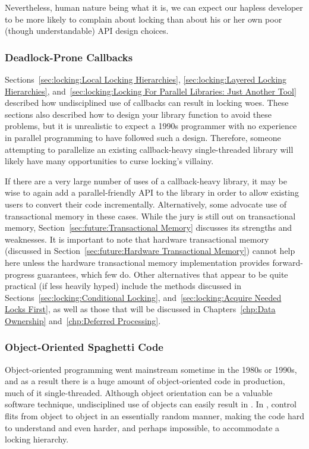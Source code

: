 Nevertheless, human nature being what it is, we can expect our hapless
developer to be more likely to complain about locking than about his
or her own poor (though understandable) API design choices.

\subsubsection{Deadlock-Prone Callbacks}
\label{sec:locking:Deadlock-Prone Callbacks}

Sections~\ref{sec:locking:Local Locking Hierarchies},
\ref{sec:locking:Layered Locking Hierarchies},
and~\ref{sec:locking:Locking For Parallel Libraries: Just Another Tool}
described how undisciplined use of callbacks can result in locking
woes.
These sections also described how to design your library function to
avoid these problems, but it is unrealistic to expect a 1990s programmer
with no experience in parallel programming to have followed such a design.
Therefore, someone attempting to parallelize an existing callback-heavy
single-threaded library will likely have many opportunities to curse
locking's villainy.

If there are a very large number of uses of a callback-heavy library,
it may be wise to again add a parallel-friendly API to the library in
order to allow existing users to convert their code incrementally.
Alternatively, some advocate use of transactional memory in these cases.
While the jury is still out on transactional memory,
Section~\ref{sec:future:Transactional Memory} discusses its strengths and
weaknesses.
It is important to note that hardware transactional memory
(discussed in
Section~\ref{sec:future:Hardware Transactional Memory})
cannot help here unless the hardware transactional memory implementation
provides forward-progress guarantees, which few do.
Other alternatives that appear to be quite practical (if less heavily
hyped) include the methods discussed in
Sections~\ref{sec:locking:Conditional Locking},
and~\ref{sec:locking:Acquire Needed Locks First},
as well as those that will be discussed in
Chapters~\ref{chp:Data Ownership}
and~\ref{chp:Deferred Processing}.

\subsubsection{Object-Oriented Spaghetti Code}
\label{sec:locking:Object-Oriented Spaghetti Code}

Object-oriented programming went mainstream sometime in the 1980s or
1990s, and as a result there is a huge amount of object-oriented code
in production, much of it single-threaded.
Although object orientation can be a valuable software technique,
undisciplined use of objects can easily result in
.
In , control flits from object to object
in an essentially random manner, making the code hard to understand
and even harder, and perhaps impossible, to accommodate a locking hierarchy.

